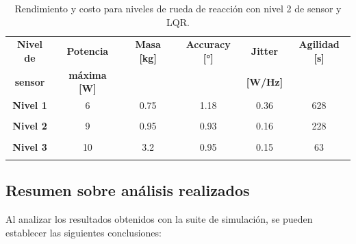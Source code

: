 \begin{table}[h!]
	\centering
	\caption{Rendimiento y costo para niveles de rueda de reacción con nivel 2 de sensor y LQR.}
	\begin{tabular}{|c|c|c|c|c|c|}
		\hline
		\textbf{Nivel de}   & \textbf{Potencia} & \textbf{Masa [kg]} & \textbf{Accuracy [°]} & \textbf{Jitter} & \textbf{Agilidad [s]}  \\ 
		\textbf{sensor}  & \textbf{máxima [W]} & & & \textbf{[W/Hz]} &  \\
		\hline
		\textbf{Nivel 1}   & 6  & 0.75  & 1.18 & 0.36 & 628  \\
		&  &   &  &  &    \\
		\hline
		\textbf{Nivel 2}   & 9  & 0.95  & 0.93 & 0.16 & 228   \\
		& & & & &   \\
		\hline
		\textbf{Nivel 3}   & 10  & 3.2  & 0.95 & 0.15 & 63   \\
		& & & & &   \\
		\hline		
	\end{tabular}
	\label{tab:RW_LQR_actuadores}
\end{table}

\subsection{Resumen sobre análisis realizados}

Al analizar los resultados obtenidos con la suite de simulación, se pueden establecer las siguientes conclusiones:

